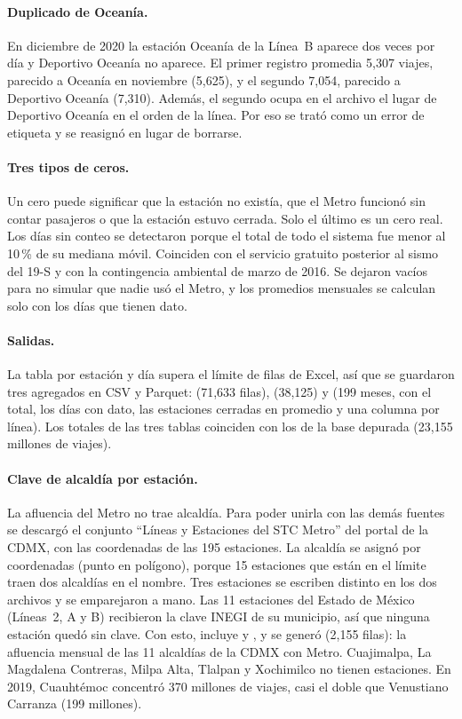 \paragraph{Duplicado de Oceanía.} En diciembre de 2020 la estación Oceanía de la Línea~B aparece dos
veces por día y Deportivo Oceanía no aparece. El primer registro promedia 5,307 viajes, parecido a
Oceanía en noviembre (5,625), y el segundo 7,054, parecido a Deportivo Oceanía (7,310). Además, el
segundo ocupa en el archivo el lugar de Deportivo Oceanía en el orden de la línea. Por eso se trató
como un error de etiqueta y se reasignó en lugar de borrarse.

\paragraph{Tres tipos de ceros.} Un cero puede significar que la estación no existía, que el Metro
funcionó sin contar pasajeros o que la estación estuvo cerrada. Solo el último es un cero real. Los
días sin conteo se detectaron porque el total de todo el sistema fue menor al 10\,\% de su mediana
móvil. Coinciden con el servicio gratuito posterior al sismo del 19-S y con la contingencia ambiental
de marzo de 2016. Se dejaron vacíos para no simular que nadie usó el Metro, y los promedios mensuales
se calculan solo con los días que tienen dato.

\paragraph{Salidas.} La tabla por estación y día supera el límite de filas de Excel, así que se
guardaron tres agregados en CSV y Parquet:  (71,633 filas),
 (38,125) y  (199 meses, con el total, los días con
dato, las estaciones cerradas en promedio y una columna por línea). Los totales de las tres tablas
coinciden con los de la base depurada (23,155 millones de viajes).

\paragraph{Clave de alcaldía por estación.} La afluencia del Metro no trae alcaldía. Para poder unirla
con las demás fuentes se descargó el conjunto \enquote{Líneas y Estaciones del STC Metro} del portal de
la CDMX, con las coordenadas de las 195 estaciones. La alcaldía se asignó por coordenadas (punto en
polígono), porque 15 estaciones que están en el límite traen dos alcaldías en el nombre. Tres
estaciones se escriben distinto en los dos archivos y se emparejaron a mano. Las 11 estaciones del
Estado de México (Líneas~2, A y B) recibieron la clave INEGI de su municipio, así que ninguna estación
quedó sin clave. Con esto,  incluye  y
, y se generó  (2,155 filas): la afluencia mensual de las
11 alcaldías de la CDMX con Metro. Cuajimalpa, La Magdalena Contreras, Milpa Alta, Tlalpan y
Xochimilco no tienen estaciones. En 2019, Cuauhtémoc concentró 370 millones de viajes, casi el doble
que Venustiano Carranza (199 millones).

